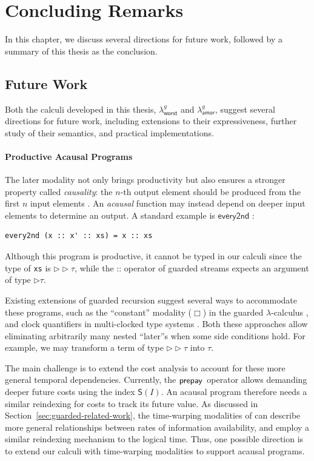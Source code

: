 \chapter{Concluding Remarks}\label{chap:conclusion}
In this chapter, we discuss several directions for future work, followed by a summary of this thesis as the conclusion.

\section{Future Work}
Both the calculi developed in this thesis, $\lambda^g_{\mathsf{worst}}$ and $\lambda^g_{\mathsf{amor}}$, suggest several directions for future work, including extensions to their expressiveness, further study of their semantics, and practical implementations.

\subsubsection{Productive Acausal Programs}
The later modality not only brings productivity but also ensures a stronger property called \emph{causality}:
the $n$-th output element should be produced from the first $n$ input elements \citep{KrishnaswamiB11}.
An \emph{acausal} function may instead depend on deeper input elements to determine an output.
A standard example is $\mathsf{every2nd}$ \citep{cloustonGuardedLambdaCalculusProgramming2017a}:
\begin{lstlisting}[style=hs] 
every2nd (x :: x' :: xs) = x :: xs
\end{lstlisting}
Although this program is productive, it cannot be typed in our calculi since the type of \texttt{xs} is $\triangleright \triangleright \tau$, while 
the :: operator of guarded streams expects an argument of type $\triangleright\tau$.

Existing extensions of guarded recursion suggest several ways to accommodate these programs, such as the ``constant'' modality ($\Box$) in the guarded $\lambda$-calculus \citep{cloustonGuardedLambdaCalculusProgramming2017a}, and 
clock quantifiers in multi-clocked type systems \citep{atkeyProductiveCoprogrammingGuarded2013a}.
Both these approaches allow eliminating arbitrarily many nested ``later''s when some side conditions hold. For example, we may transform a term of type $\triangleright \triangleright \tau$ into
$\tau$.

The main challenge is to extend the cost analysis to account for these more general temporal dependencies.
Currently, the $\mathsf{prepay}\,$ operator allows demanding deeper future costs using the index $\mathsf{S}(I)$. An acausal 
program therefore needs a similar reindexing for costs to track its future value.
As discussed in Section~\ref{sec:guarded-related-work}, the time-warping modalities of \cite{guattoGeneralizedModalityRecursion2018d} can describe more general relationships between rates of information availability, and employ a similar reindexing mechanism
to the logical time. Thus, one possible direction is to extend our calculi with time-warping modalities to support acausal programs.

